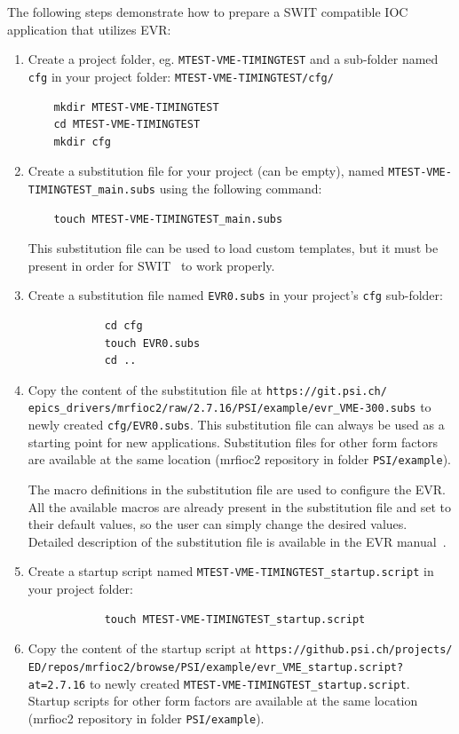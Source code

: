 \documentclass[12pt,a4paper]{article}
\newcommand{\latestDriverVersion}{2.7.16}
\begin{document}
The following steps demonstrate how to prepare a SWIT compatible IOC application that utilizes EVR:
\begin{enumerate}

	\item Create a project folder, eg. \texttt{MTEST-VME-TIMINGTEST} and a sub-folder named \texttt{cfg} in your project folder: \texttt{MTEST-VME-TIMINGTEST/cfg/}
\begin{verbatim}
	mkdir MTEST-VME-TIMINGTEST
	cd MTEST-VME-TIMINGTEST
	mkdir cfg
\end{verbatim}

	\item Create a substitution file for your project (can be empty), named \texttt{MTEST-VME-TIMINGTEST\_main.subs} using the following command: 
\begin{verbatim}
	touch MTEST-VME-TIMINGTEST_main.subs
\end{verbatim}	
	This substitution file can be used to load custom templates, but it must be present in order for SWIT~\cite{swit} to work properly.
	
	\item 
		Create a substitution file named \texttt{EVR0.subs} in your project's \texttt{cfg} sub-folder:
		\begin{verbatim}
			cd cfg
			touch EVR0.subs
			cd ..
		\end{verbatim}
	\item \label{quickstart:copySubs} Copy the content of the substitution file  at \texttt{https://git.psi.ch/} \texttt{epics\_drivers/mrfioc2/raw/\latestDriverVersion/PSI/example/evr\_VME-300.subs} to newly created \texttt{cfg/EVR0.subs}. This substitution file can always be used as a starting point for new applications. Substitution files for other form factors are available at the same location (mrfioc2 repository in folder \texttt{PSI/example}).
	
	The macro definitions in the substitution file are used to configure the EVR. All the available macros are already present in the substitution file and set to their default values, so the user can simply change the desired values. Detailed description of the substitution file is available in the EVR manual~\cite{evr_manual}.

	\item
		Create a startup script named \texttt{MTEST-VME-TIMINGTEST\_startup.script} in your project folder:
		\begin{verbatim}
			touch MTEST-VME-TIMINGTEST_startup.script
		\end{verbatim}
	\item 
		Copy the content of the startup script at \texttt{https://github.psi.ch/projects/} \texttt{ED/repos/mrfioc2/browse/PSI/example/evr\_VME\_startup.script?at=\latestDriverVersion} to newly created \texttt{MTEST-VME-TIMINGTEST\_startup.script}. Startup scripts for other form factors are available at the same location (mrfioc2 repository in folder \texttt{PSI/example}).


\end{enumerate}
\end{document}
